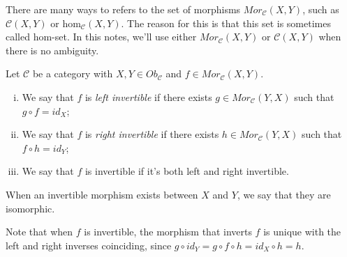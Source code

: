 There are many ways to refers to the set of morphisms $Mor_\mathcal C (X,Y)$, such as
$\mathcal C(X,Y)$ or $\text{hom}_\mathcal C (X,Y)$. The reason for this is that
this set is sometimes called hom-set. In this notes, we'll use either $Mor_\mathcal C (X,Y)$
or $\mathcal C (X,Y)$ when there is no ambiguity.

\begin{definition}
  Let $\mathcal C$ be a category with $X,Y \in Ob_\mathcal C$ and $f \in Mor_\mathcal C (X,Y)$.
  \begin{enumerate}[(i)]
    \item We say that $f$ is \textit{left invertible} if there exists $g \in Mor_\mathcal C (Y,X)$ such
      that $g \circ f = id_X$;
    \item We say that $f$ is \textit{right invertible} if there exists $h \in Mor_\mathcal C (Y,X)$ such
      that $f \circ h = id_Y$;
    \item We say that $f$ is invertible if it's both left and right invertible.
  \end{enumerate}
  When an invertible morphism exists between $X$ and $Y$, we say that they are isomorphic.
\end{definition}
Note that when $f$ is invertible, the morphism that inverts $f$ is unique with the left and
right inverses coinciding, since
$g \circ id_Y = g \circ f \circ h = id_X \circ h = h$.
